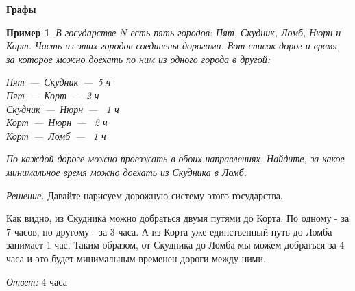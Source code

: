 \documentclass[12pt,a4paper,fleqn]{article}
\newtheorem{example}{Пример}
\begin{document}
\begin{center}
	\bf \Large Графы
\end{center}

	\begin{example}
	В государстве $N$ есть пять городов: Пят, Скудник, Ломб, Нюрн и Корт. Часть из этих городов соединены дорогами. Вот список дорог и время, за которое можно доехать по ним из одного города в другой:
	\begin{center}
	
	Пят~---~Скудник~---~5 ч \\
	Пят~---~Корт~---~2 ч \\
	Скудник~---~Нюрн~---~ 1 ч\\
	Корт~---~Нюрн~---~ 2 ч\\
	Корт~---~Ломб~---~ 1 ч\\
	\end{center}
	По каждой дороге можно проезжать в обоих направлениях. Найдите, за какое минимальное время можно доехать из Скудника в Ломб.
	\end{example}
	\textit{Решение.} Давайте нарисуем дорожную систему этого государства.
	\begin{paracol}{2}
	\switchcolumn
	Как видно, из Скудника можно добраться двумя путями до Корта. По одному - за 7 часов, по другому - за 3 часа. А из Корта уже единственный путь до Ломба занимает 1 час. Таким образом, от Скудника до Ломба мы можем добраться за 4 часа и это будет минимальным временен дороги между ними.
	
	\textit{Ответ:} 4 часа 
	\end{paracol}
	
\end{document}
